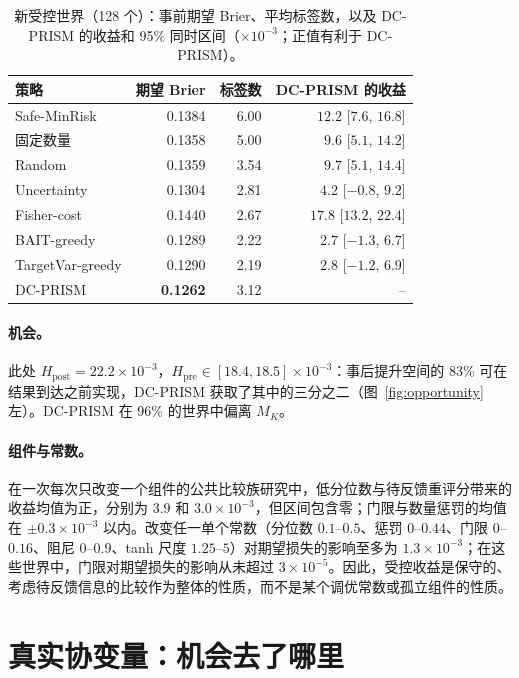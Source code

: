 \documentclass[runningheads]{llncs}
\begin{document}
\begin{table}[t]
\caption{新受控世界（128 个）：事前期望 Brier、平均标签数，以及 DC-PRISM 的收益和 95\% 同时区间（$\times10^{-3}$；正值有利于 DC-PRISM）。}
\label{tab:controlled}
\centering\small
\begin{tabular}{lrrr}
\toprule
策略 & 期望 Brier & 标签数 & DC-PRISM 的收益 \\
\midrule
Safe-MinRisk & 0.1384 & 6.00 & $12.2$ [$7.6$, $16.8$] \\
固定数量 & 0.1358 & 5.00 & $9.6$ [$5.1$, $14.2$] \\
Random & 0.1359 & 3.54 & $9.7$ [$5.1$, $14.4$] \\
Uncertainty & 0.1304 & 2.81 & $4.2$ [$-0.8$, $9.2$] \\
Fisher-cost & 0.1440 & 2.67 & $17.8$ [$13.2$, $22.4$] \\
BAIT-greedy & 0.1289 & 2.22 & $2.7$ [$-1.3$, $6.7$] \\
TargetVar-greedy & 0.1290 & 2.19 & $2.8$ [$-1.2$, $6.9$] \\
DC-PRISM & \textbf{0.1262} & 3.12 & -- \\
\bottomrule
\end{tabular}
\end{table}

\paragraph{机会。}此处 $H_{\mathrm{post}}=22.2\times10^{-3}$，$H_{\mathrm{pre}}\in[18.4,18.5]\times10^{-3}$：事后提升空间的 83\% 可在结果到达之前实现，DC-PRISM 获取了其中的三分之二（图~\ref{fig:opportunity} 左）。DC-PRISM 在 96\% 的世界中偏离 $M_K$。

\paragraph{组件与常数。}在一次每次只改变一个组件的公共比较族研究中，低分位数与待反馈重评分带来的收益均值为正，分别为 $3.9$ 和 $3.0\times10^{-3}$，但区间包含零；门限与数量惩罚的均值在 $\pm0.3\times10^{-3}$ 以内。改变任一单个常数（分位数 $0.1$--$0.5$、惩罚 $0$--$0.44$、门限 $0$--$0.16$、阻尼 $0$--$0.9$、tanh 尺度 $1.25$--$5$）对期望损失的影响至多为 $1.3\times10^{-3}$；在这些世界中，门限对期望损失的影响从未超过 $3\times10^{-5}$。因此，受控收益是保守的、考虑待反馈信息的比较作为整体的性质，而不是某个调优常数或孤立组件的性质。

\section{真实协变量：机会去了哪里}
\label{sec:realx}
\end{document}
